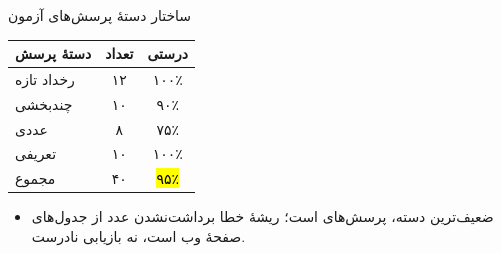 \begin{frame}[noframenumbering]{ساختار دستهٔ پرسش‌های آزمون}
  \begin{center}
    \small
    \begin{tabular}{@{}lcc@{}}
      \toprule
      دستهٔ پرسش & تعداد & درستی \\
      \midrule
      رخداد تازه     & ۱۲ & ۱۰۰٪ \\
      چندبخشی        & ۱۰ & ۹۰٪  \\
      عددی           & ۸  & ۷۵٪  \\
      تعریفی         & ۱۰ & ۱۰۰٪ \\
      \midrule
      مجموع          & ۴۰ & \hl{۹۵٪} \\
      \bottomrule
    \end{tabular}
  \end{center}

  \begin{itemize}
    \item ضعیف‌ترین دسته، پرسش‌های  است؛ ریشهٔ خطا برداشت‌نشدن عدد از
          جدول‌های صفحهٔ وب است، نه بازیابی نادرست.
  \end{itemize}
\end{frame}
